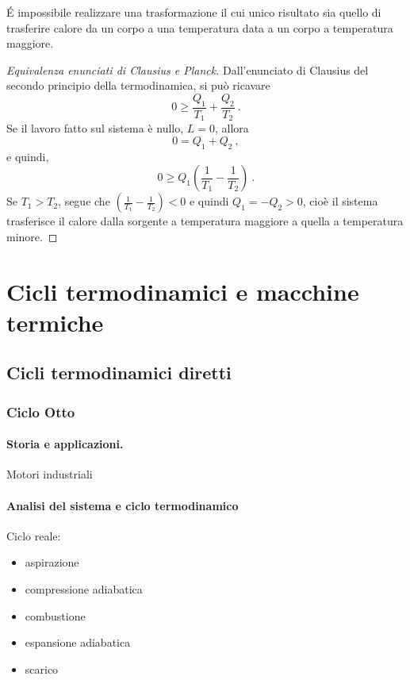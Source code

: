 \begin{definition} \'E impossibile realizzare una trasformazione il cui unico risultato sia quello di trasferire calore da un corpo a una temperatura data a un corpo a temperatura maggiore.
\end{definition}
\begin{proof}[Equivalenza enunciati di Clausius e Planck] Dall'enunciato di Clausius del secondo principio della termodinamica, si può ricavare
\begin{equation}
    0 \ge \dfrac{Q_1}{T_1} + \dfrac{Q_2}{T_2} \ .
\end{equation}
Se il lavoro fatto sul sistema è nullo, $L = 0$, allora
\begin{equation}
    0 = Q_1 + Q_2 \ ,
\end{equation}
e quindi,
\begin{equation}
    0 \ge Q_1 \left( \dfrac{1}{T_1} - \dfrac{1}{T_2} \right) \ .
\end{equation}
    Se $T_1 > T_2$, segue che $\left(\frac{1}{T_1} - \frac{1}{T_2} \right) < 0$ e quindi $Q_1 = - Q_2 > 0$, cioè il sistema trasferisce il calore dalla sorgente a temperatura maggiore a quella a temperatura minore.

\end{proof}

\section{Cicli termodinamici e macchine termiche}
\subsection{Cicli termodinamici diretti}

\subsubsection{Ciclo Otto}
\paragraph{Storia e applicazioni.} {\color{red} Motori industriali}
\paragraph{Analisi del sistema e ciclo termodinamico}

Ciclo reale:
\begin{itemize}
    \item aspirazione
    \item compressione adiabatica
    \item combustione
    \item espansione adiabatica
    \item scarico 
\end{itemize}

